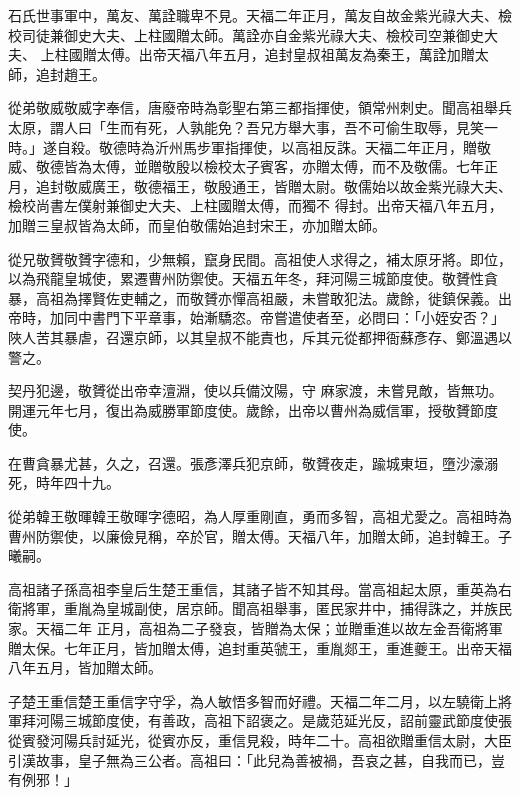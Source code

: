 \begin{pinyinscope}
 石氏世事軍中，萬友、萬詮職卑不見。天福二年正月，萬友自故金紫光祿大夫、檢校司徒兼御史大夫、上柱國贈太師。萬詮亦自金紫光祿大夫、檢校司空兼御史大夫、
 上柱國贈太傅。出帝天福八年五月，追封皇叔祖萬友為秦王，萬詮加贈太師，追封趙王。



 從弟敬威敬威字奉信，唐廢帝時為彰聖右第三都指揮使，領常州刺史。聞高祖舉兵太原，謂人曰「生而有死，人孰能免？吾兄方舉大事，吾不可偷生取辱，見笑一時。」遂自殺。敬德時為沂州馬步軍指揮使，以高祖反誅。天福二年正月，贈敬威、敬德皆為太傅，並贈敬殷以檢校太子賓客，亦贈太傅，而不及敬儒。七年正月，追封敬威廣王，敬德福王，敬殷通王，皆贈太尉。敬儒始以故金紫光祿大夫、檢校尚書左僕射兼御史大夫、上柱國贈太傅，而獨不
 得封。出帝天福八年五月，加贈三皇叔皆為太師，而皇伯敬儒始追封宋王，亦加贈太師。



 從兄敬贇敬贇字德和，少無賴，竄身民間。高祖使人求得之，補太原牙將。即位，以為飛龍皇城使，累遷曹州防禦使。天福五年冬，拜河陽三城節度使。敬贇性貪暴，高祖為擇賢佐吏輔之，而敬贇亦憚高祖嚴，未嘗敢犯法。歲餘，徙鎮保義。出帝時，加同中書門下平章事，始漸驕恣。帝嘗遣使者至，必問曰：「小姪安否？」陜人苦其暴虐，召還京師，以其皇叔不能責也，斥其元從都押衙蘇彥存、鄭溫遇以警之。



 契丹犯邊，敬贇從出帝幸澶淵，使以兵備汶陽，守
 麻家渡，未嘗見敵，皆無功。開運元年七月，復出為威勝軍節度使。歲餘，出帝以曹州為威信軍，授敬贇節度使。



 在曹貪暴尤甚，久之，召還。張彥澤兵犯京師，敬贇夜走，踰城東垣，墮沙濠溺死，時年四十九。



 從弟韓王敬暉韓王敬暉字德昭，為人厚重剛直，勇而多智，高祖尤愛之。高祖時為曹州防禦使，以廉儉見稱，卒於官，贈太傅。天福八年，加贈太師，追封韓王。子曦嗣。



 高祖諸子孫高祖李皇后生楚王重信，其諸子皆不知其母。當高祖起太原，重英為右衛將軍，重胤為皇城副使，居京師。聞高祖舉事，匿民家井中，捕得誅之，并族民家。天福二年
 正月，高祖為二子發哀，皆贈為太保；並贈重進以故左金吾衛將軍贈太保。七年正月，皆加贈太傅，追封重英虢王，重胤郯王，重進夔王。出帝天福八年五月，皆加贈太師。



 子楚王重信楚王重信字守孚，為人敏悟多智而好禮。天福二年二月，以左驍衛上將軍拜河陽三城節度使，有善政，高祖下詔褒之。是歲范延光反，詔前靈武節度使張從賓發河陽兵討延光，從賓亦反，重信見殺，時年二十。高祖欲贈重信太尉，大臣引漢故事，皇子無為三公者。高祖曰：「此兒為善被禍，吾哀之甚，自我而已，豈有例邪！」




\end{pinyinscope}

